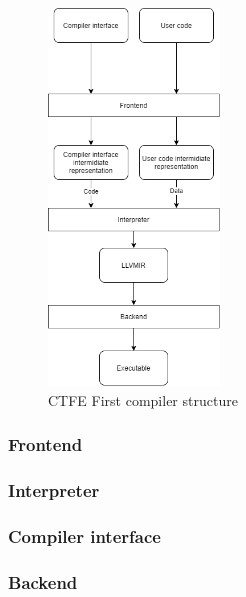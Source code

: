 \begin{figure}
	\includegraphics[height=10cm]{pictures/compiler-structure.png}
	\caption{CTFE First compiler structure}
	\label{CTFE-first-compiler-structure}
\end{figure}

\subsubsection{Frontend}
\label{frontend}

\subsubsection{Interpreter}
\label{interpreter}

\subsubsection{Compiler interface} 
\label{compiler-interface}

\subsubsection{Backend}
\label{backend}
